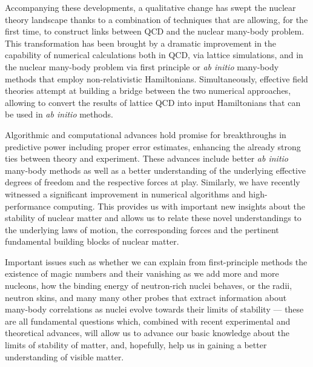 Accompanying these developments, a qualitative change has swept the
nuclear theory landscape thanks to a combination of techniques that are
allowing, for the first time, to construct links between QCD and
the nuclear many-body problem. This transformation has been brought by a dramatic
improvement in the capability of numerical calculations both in QCD,
via lattice simulations, and in the nuclear many-body problem via first principle or {\em ab initio} 
many-body methods that employ non-relativistic
Hamiltonians. Simultaneously, effective field
theories attempt at building  a bridge between the two numerical approaches,
allowing to convert the results of lattice QCD into input Hamiltonians that can be used in {\em ab initio}
methods.

Algorithmic and computational advances hold promise for
breakthroughs in predictive power including proper error estimates,
enhancing the already strong ties between theory and experiment.
These advances include better {\em ab initio} many-body methods as well as a
better understanding of the underlying effective degrees of freedom
and the respective forces at play.  Similarly, we have recently witnessed a significant improvement in numerical
algorithms and high-performance computing.
This provides us with important new insights about the stability
of nuclear matter and allows us to relate these novel understandings to
the underlying laws of motion, the corresponding forces and the
pertinent fundamental building blocks of nuclear matter.

Important issues such as whether we can explain from first-principle
methods the existence of magic numbers and their vanishing as we add
more and more nucleons, how the binding energy of neutron-rich nuclei
behaves, or the radii, neutron skins, and many many other probes that
extract information about many-body correlations as nuclei evolve
towards their limits of stability --- these are all fundamental
questions which, combined with recent experimental and theoretical
advances, will allow us to advance our basic knowledge about the
limits of stability of matter, and, hopefully, help us in gaining a
better understanding of visible matter.

